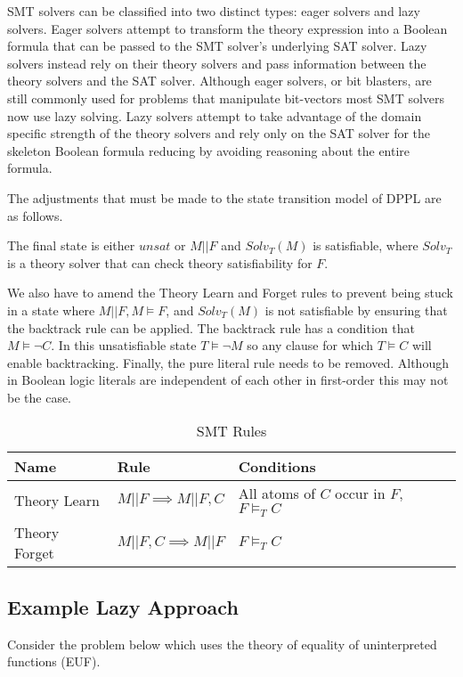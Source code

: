 \documentclass[]{final_report}
\begin{document}
SMT solvers can be classified into two distinct types: eager solvers and lazy solvers. Eager solvers attempt to transform the theory expression into a Boolean formula that can be passed to the SMT solver's underlying SAT solver. Lazy solvers instead rely on their theory solvers and pass information between the theory solvers and the SAT solver. Although eager solvers, or bit blasters, are still commonly used for problems that manipulate bit-vectors most SMT solvers now use lazy solving. Lazy solvers attempt to take advantage of the domain specific strength of the theory solvers and rely only on the SAT solver for the skeleton Boolean formula reducing by avoiding reasoning about the entire formula.  ~\cite{sattosmt} ~\cite{smtdpplt}

The adjustments that must be made to the state transition model of DPPL are as follows. 

The final state is either $unsat$ or $M || F$ and $Solv _T(M)$ is satisfiable, where $Solv_T$ is a theory solver that can check theory satisfiability for $F$.

We also have to amend the Theory Learn and Forget rules to prevent being stuck in a state where $M || F, M \models F$, and $Solv_T(M)$ is not satisfiable by ensuring that the backtrack rule can be applied. The backtrack rule has a condition that $M \models \lnot C$. In this unsatisfiable state $T \models \lnot M$ so any clause for which $T \models C$ will enable backtracking. Finally, the pure literal rule needs to be removed. Although in Boolean logic literals are independent of each other in first-order this may not be the case.


\begin{table}[h]
\centering
\caption{SMT Rules}
\label{smt-rulesl}
\begin{tabular}{|l|l|l|}
\hline
Name & Rule & Conditions \\ \hline
Theory Learn & $M || F \implies M|| F, C $ & All atoms of $C$ occur in $F$, $F \models _T C $ \\ \hline
Theory Forget & $M || F, C \implies M || F $ & $F \models _T C$ \\ \hline
\end{tabular}
\end{table}

\subsection{Example Lazy Approach}
Consider the problem below which uses the theory of equality of uninterpreted functions (EUF).
\end{document}
